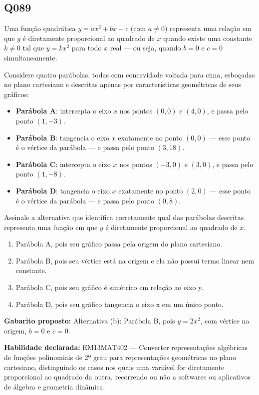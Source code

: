 \documentclass[11pt,a4paper]{article}
\begin{document}
\begin{samepage}
\subsection*{Q089}
Uma função quadrática $y = ax^2 + bx + c$ (com $a \neq 0$) representa uma relação em que $y$ é diretamente proporcional ao quadrado de $x$ quando existe uma constante $k \neq 0$ tal que $y = kx^2$ para todo $x$ real — ou seja, quando $b = 0$ e $c = 0$ simultaneamente.

Considere quatro parábolas, todas com concavidade voltada para cima, esboçadas no plano cartesiano e descritas apenas por características geométricas de seus gráficos:

\begin{itemize}[nosep,leftmargin=*]
\item \textbf{Parábola A}: intercepta o eixo $x$ nos pontos $(0,0)$ e $(4,0)$, e passa pelo ponto $(1,-3)$.
\item \textbf{Parábola B}: tangencia o eixo $x$ exatamente no ponto $(0,0)$ — esse ponto é o vértice da parábola — e passa pelo ponto $(3,18)$.
\item \textbf{Parábola C}: intercepta o eixo $x$ nos pontos $(-3,0)$ e $(3,0)$, e passa pelo ponto $(1,-8)$.
\item \textbf{Parábola D}: tangencia o eixo $x$ exatamente no ponto $(2,0)$ — esse ponto é o vértice da parábola — e passa pelo ponto $(0,8)$.
\end{itemize}

Assinale a alternativa que identifica corretamente qual das parábolas descritas representa uma função em que $y$ é diretamente proporcional ao quadrado de $x$.
\begin{enumerate}[label=(\alph*),nosep,leftmargin=*]
\item Parábola A, pois seu gráfico passa pela origem do plano cartesiano.
\item Parábola B, pois seu vértice está na origem e ela não possui termo linear nem constante.
\item Parábola C, pois seu gráfico é simétrico em relação ao eixo y.
\item Parábola D, pois seu gráfico tangencia o eixo x em um único ponto.
\end{enumerate}

\textbf{Gabarito proposto:} Alternativa (b): Parábola B, pois $y=2x^2$, com vértice na origem, $b=0$ e $c=0$.

\textbf{Habilidade declarada:} EM13MAT402 --- Converter representações algébricas de funções polinomiais de 2º grau para representações geométricas no plano cartesiano, distinguindo os casos nos quais uma variável for diretamente proporcional ao quadrado da outra, recorrendo ou não a softwares ou aplicativos de álgebra e geometria dinâmica.
\end{samepage}
\end{document}
